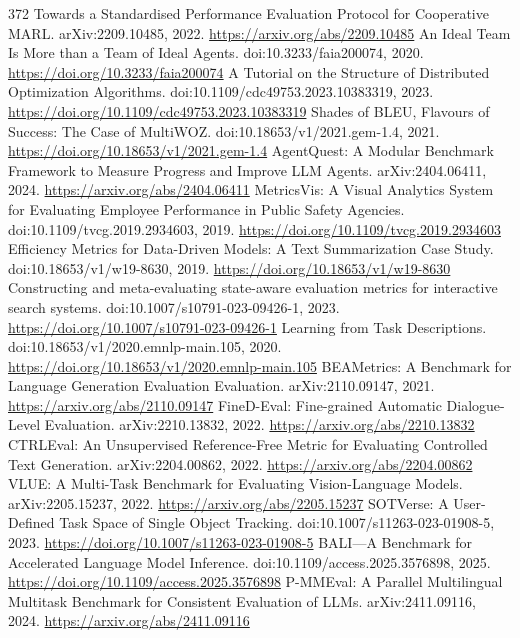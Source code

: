 \documentclass[11pt]{article}
\begin{document}
\begin{thebibliography}{372}
 Towards a Standardised Performance Evaluation Protocol for Cooperative MARL. arXiv:2209.10485, 2022. \url{https://arxiv.org/abs/2209.10485}
 An Ideal Team Is More than a Team of Ideal Agents. doi:10.3233/faia200074, 2020. \url{https://doi.org/10.3233/faia200074}
 A Tutorial on the Structure of Distributed Optimization Algorithms. doi:10.1109/cdc49753.2023.10383319, 2023. \url{https://doi.org/10.1109/cdc49753.2023.10383319}
 Shades of BLEU, Flavours of Success: The Case of MultiWOZ. doi:10.18653/v1/2021.gem-1.4, 2021. \url{https://doi.org/10.18653/v1/2021.gem-1.4}
 AgentQuest: A Modular Benchmark Framework to Measure Progress and Improve LLM Agents. arXiv:2404.06411, 2024. \url{https://arxiv.org/abs/2404.06411}
 MetricsVis: A Visual Analytics System for Evaluating Employee Performance in Public Safety Agencies. doi:10.1109/tvcg.2019.2934603, 2019. \url{https://doi.org/10.1109/tvcg.2019.2934603}
 Efficiency Metrics for Data-Driven Models: A Text Summarization Case Study. doi:10.18653/v1/w19-8630, 2019. \url{https://doi.org/10.18653/v1/w19-8630}
 Constructing and meta-evaluating state-aware evaluation metrics for interactive search systems. doi:10.1007/s10791-023-09426-1, 2023. \url{https://doi.org/10.1007/s10791-023-09426-1}
 Learning from Task Descriptions. doi:10.18653/v1/2020.emnlp-main.105, 2020. \url{https://doi.org/10.18653/v1/2020.emnlp-main.105}
 BEAMetrics: A Benchmark for Language Generation Evaluation Evaluation. arXiv:2110.09147, 2021. \url{https://arxiv.org/abs/2110.09147}
 FineD-Eval: Fine-grained Automatic Dialogue-Level Evaluation. arXiv:2210.13832, 2022. \url{https://arxiv.org/abs/2210.13832}
 CTRLEval: An Unsupervised Reference-Free Metric for Evaluating Controlled Text Generation. arXiv:2204.00862, 2022. \url{https://arxiv.org/abs/2204.00862}
 VLUE: A Multi-Task Benchmark for Evaluating Vision-Language Models. arXiv:2205.15237, 2022. \url{https://arxiv.org/abs/2205.15237}
 SOTVerse: A User-Defined Task Space of Single Object Tracking. doi:10.1007/s11263-023-01908-5, 2023. \url{https://doi.org/10.1007/s11263-023-01908-5}
 BALI—A Benchmark for Accelerated Language Model Inference. doi:10.1109/access.2025.3576898, 2025. \url{https://doi.org/10.1109/access.2025.3576898}
 P-MMEval: A Parallel Multilingual Multitask Benchmark for Consistent Evaluation of LLMs. arXiv:2411.09116, 2024. \url{https://arxiv.org/abs/2411.09116}

\end{thebibliography}
\end{document}
